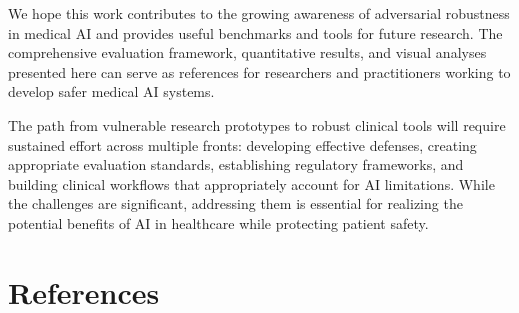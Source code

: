 \documentclass[12pt,a4paper]{article}
\begin{document}
We hope this work contributes to the growing awareness of adversarial robustness in medical AI and provides useful benchmarks and tools for future research. The comprehensive evaluation framework, quantitative results, and visual analyses presented here can serve as references for researchers and practitioners working to develop safer medical AI systems.

The path from vulnerable research prototypes to robust clinical tools will require sustained effort across multiple fronts: developing effective defenses, creating appropriate evaluation standards, establishing regulatory frameworks, and building clinical workflows that appropriately account for AI limitations. While the challenges are significant, addressing them is essential for realizing the potential benefits of AI in healthcare while protecting patient safety.

\newpage
\section*{References}
\printbibliography[heading=none]
\end{document}
